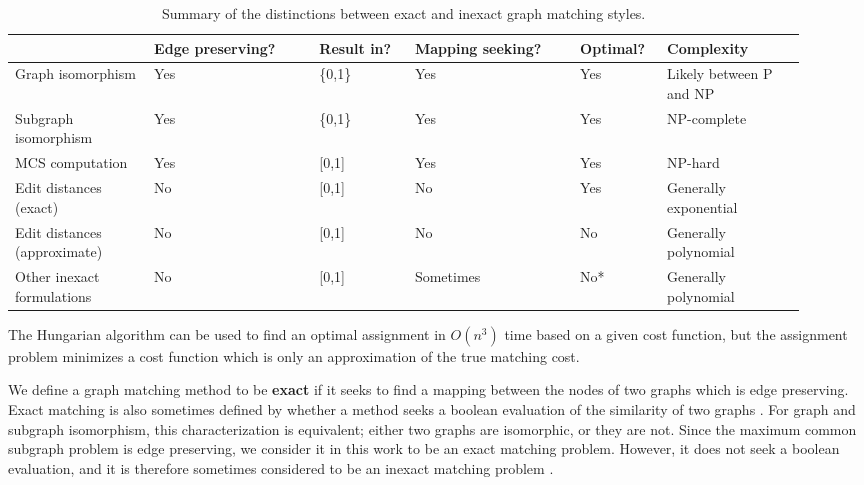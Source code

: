 \documentclass[12pt]{thesis}
\theoremstyle{plain}
\theoremstyle{definition}
\theoremstyle{remark}
\begin{document}
\begin{table}[t!]
\centering
\setlength\extrarowheight{3pt}\setlength{\tabcolsep}{2.5pt}
\begin{tabular}{|L{0.16\linewidth}|C{0.19\linewidth}|C{0.11\linewidth}|C{0.195\linewidth}|C{0.105\linewidth}|C{0.165\linewidth}|}
\hline
 & Edge preserving? & Result in? & Mapping seeking? & Optimal? & Complexity \\ \hline\hline
Graph isomorphism & Yes & \{0,1\} & Yes & Yes & Likely between P and NP \\ \hline
Subgraph isomorphism & Yes & \{0,1\} & Yes & Yes & NP-complete \\ \hline
MCS computation & Yes & [0,1] & Yes & Yes & NP-hard \\ \hline
Edit distances (exact) & No & [0,1] & No & Yes & Generally exponential \\ \hline
Edit distances (approximate) & No & [0,1] & No & No & Generally polynomial \\ \hline
Other inexact formulations & No & [0,1] & Sometimes & No* & Generally polynomial \\ \hline
\end{tabular}
\caption{Summary of the distinctions between exact and inexact graph matching styles.}
\vspace{-8pt}
\flushleft\footnotesize *The Hungarian algorithm can be used to find an optimal assignment in $O(n^3)$ time based on a given cost function, but the assignment problem minimizes a cost function which is only an approximation of the true matching cost.
\label{exact_vs_inexact}
\end{table}

We define a graph matching method to be \textbf{exact} if it seeks to find a mapping between the nodes of two graphs which is edge preserving. Exact matching is also sometimes defined by whether a method seeks a boolean evaluation of the similarity of two graphs \cite{Livi_2012,Emmert_Streib_2016}. For graph and subgraph isomorphism, this characterization is equivalent; either two graphs are isomorphic, or they are not. Since the maximum common subgraph problem is edge preserving, we consider it in this work to be an exact matching problem. However, it does not seek a boolean evaluation, and it is therefore sometimes considered to be an inexact matching problem \cite{Livi_2012}. 
\end{document}
